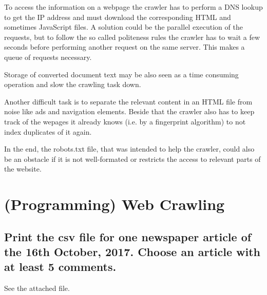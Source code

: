 \documentclass{scrartcl}
\begin{document}
To access the information on a webpage the crawler has to perform a DNS lookup to get the IP address and must download the corresponding HTML and sometimes JavaScript files. A solution could be the parallel execution of the requests, but to follow the so called politeness rules the crawler has to wait a few seconds before performing another request on the same server. This makes a queue of requests necessary. 

Storage of converted document text may be also seen as a time consuming operation and slow the crawling task down.

Another difficult task is to separate the relevant content in an HTML file from noise like ads and navigation elements. Beside that the crawler also has to keep track of the wepages it already knows (i.e. by a fingerprint algorithm) to not index duplicates of it again.

In the end, the robots.txt file, that was intended to help the crawler, could also be an obstacle if it is not well-formated or restricts the access to relevant parts of the website.

\section{(Programming) Web Crawling}

\subsection{Print the csv file for one newspaper article of the 16th October, 2017. Choose an article with
	at least 5 comments. }

See the attached file.
\end{document}
